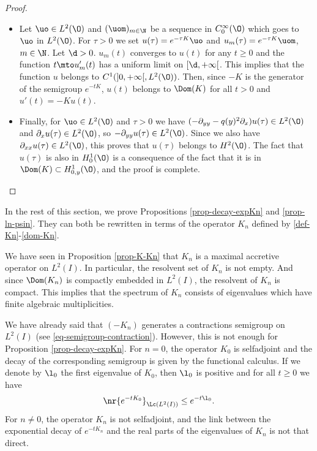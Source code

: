 \begin{proof}
\begin{itemize}
\item
Let $\uo \in L^2(\O)$ and $(\uom)_{m \in \N}$ be a sequence in $C_0^\infty(\O)$ which goes to $\uo$ in $L^2(\O)$. For $\tau > 0$ we set $u(\tau) = e^{-\tau K} \uo$ and $u_m(\tau) = e^{-\tau K} \uom$, $m \in \N$. Let $\d > 0$. $u_m(t)$ converges to $u(t)$ for any $t \geq 0$ and the function $t \mto u_m'(t)$ has a uniform limit on $[\d,+\infty[$. This implies that the function $u$ belongs to $C^1(]0,+\infty[,L^2(\O))$. Then, since $-K$ is the generator of the semigroup $e^{-tK}$, $u(t)$ belongs to $\Dom(K)$ for all $t > 0$ and $u'(t) = -K u(t)$.

\item
Finally, for $\uo \in L^2(\O)$ and $\tau > 0$ we have $(-\partial_{yy} - q(y)^2 \partial_x) u(\tau) \in L^2(\O)$ and $\partial_x u(\tau) \in L^2(\O)$, so $-\partial_{yy}u(\tau) \in L^2(\O)$. Since we also have $\partial_{xx}u(\tau) \in L^2(\O)$, this proves that $u(\tau)$ belongs to $H^2(\O)$. The fact that $u(\tau)$ is also in $H_0^1(\O)$ is a consequence of the fact that it is in $\Dom(K) \subset H^1_{0,y}(\O)$, and the proof is complete.\qedhere
\end{itemize}
\end{proof}


In the rest of this section, we prove Propositions \ref{prop-decay-expKn} and \ref{prop-ln-psin}. They can both be rewritten in terms of the operator $K_n$ defined by \eqref{def-Kn}-\eqref{dom-Kn}.

We have seen in Proposition \ref{prop-K-Kn} that $K_n$ is a maximal accretive operator on $L^2(I)$. In particular, the resolvent set of $K_n$ is not empty. And since $\Dom(K_n)$ is compactly embedded in $L^2(I)$, the resolvent of $K_n$ is compact. This implies that the spectrum of $K_n$ consists of eigenvalues which have finite algebraic multiplicities.

We have already said that $(-K_n)$ generates a contractions semigroup on $L^2(I)$ (see \eqref{eq-semigroup-contraction}). However, this is not enough for Proposition \ref{prop-decay-expKn}. For $n = 0$, the operator $K_0$ is selfadjoint and the decay of the corresponding semigroup is given by the functional calculus. If we denote by $\l_0$ the first eigenvalue of $K_0$, then $\l_0$ is positive and for all $t \geq 0$ we have
\[
\nr{e^{-t K_0}}_{\Lc(L^2(I))} \leq e^{-t\l_0}.
\]
For $n \neq 0$, the operator $K_n$ is not selfadjoint, and the link between the exponential decay of $e^{-tK_n}$ and the real parts of the eigenvalues of $K_n$ is not that direct.

